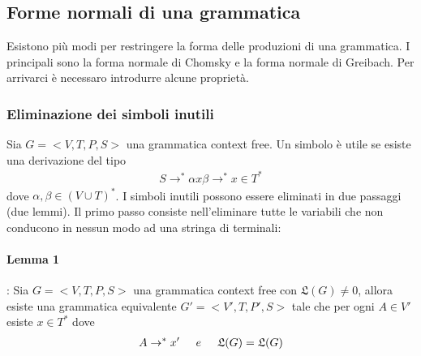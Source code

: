 \documentclass[a4paper, 10pt]{report}
\begin{document}
\subsection*{Forme normali di una grammatica}
Esistono più modi per restringere la forma delle produzioni di una grammatica. I principali sono la forma normale di Chomsky e la forma normale di Greibach. Per arrivarci è necessaro introdurre alcune proprietà.

\subsubsection*{Eliminazione dei simboli inutili} Sia $G = <V, T, P, S>$ una grammatica context free. Un simbolo è utile se esiste una derivazione del tipo
\begin{align*}
S \rightarrow^* \alpha x \beta \rightarrow^* x \in T^*
\end{align*}
\noindent dove $\alpha, \beta \in (V \cup T)^*$. I simboli inutili possono essere eliminati in due passaggi (due lemmi).
Il primo passo consiste nell'eliminare tutte le variabili che non conducono in nessun modo ad una stringa di terminali:

\paragraph*{Lemma 1}: Sia $G = <V, T, P, S>$ una grammatica context free con $\mathfrak{L}(G) \ne 0$, allora esiste una grammatica equivalente $G' = <V', T, P', S>$ tale che per ogni $A \in V'$ esiste $x \in T^*$ dove
\begin{align*}
A \rightarrow^* x' \hspace{0.5cm} e \hspace{0.5cm} \mathfrak{L}(G) = \mathfrak{L}(G)
\end{align*}
\end{document}
